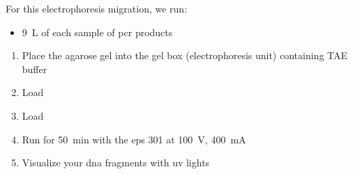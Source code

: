 For this electrophoresis migration, we run:
\begin{itemize}
\item 9~\textmu L of each sample of \gls{pcr} products
\end{itemize}

\begin{enumerate}
\item Place the agarose gel into the gel box (electrophoresis unit) containing TAE buffer
\item Load %
\item Load %
\item Run for 50~min with the \gls{eps} 301 at 100~V, 400~mA
\item Visualize your \gls{dna} fragments with \gls{uv} lights
\end{enumerate}

